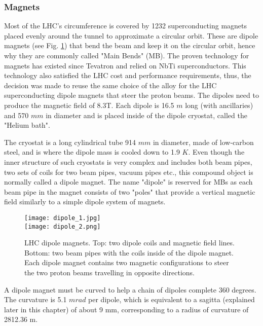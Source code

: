 \begin{normalsize}

\subsubsection{Magnets}\label{sec:magnets}

Most of the LHC's circumference is covered by 1232 superconducting magnets placed evenly around the tunnel to approximate a circular orbit. These are dipole magnets (see Fig. \ref{dipoles_coils}) that bend the beam and keep it on the circular orbit, hence why they are commonly called "Main Bends" (MB). The proven technology for magnets has existed since Tevatron and relied on NbTi superconductors. This technology also satisfied the LHC cost and performance requirements, thus, the decision was made to reuse the same choice of the alloy for the LHC superconducting dipole magnets that steer the proton beams. The dipoles need to produce the magnetic field of 8.3T. %
Each dipole is 16.5 $m$ long (with ancillaries) and 570 $mm$ in diameter and is placed inside of the dipole cryostat, called the "Helium bath". 

The cryostat is a long cylindrical tube 914 $mm$ in diameter, made of low-carbon steel, and is where the dipole mass is cooled down to 1.9 $K$. Even though the inner structure of such cryostats is very complex and includes both beam pipes, two sets of coils for two beam pipes, vacuum pipes etc., this compound object is normally called a dipole magnet. The name "dipole" is reserved for MBs as each beam pipe in the magnet consists of two "poles" that provide a vertical magnetic field similarly to a simple dipole system of magnets. 


\begin{figure}[H]
\centering
\texttt{[image: dipole\_1.jpg]}\\
\vspace{0.5cm}
\texttt{[image: dipole\_2.png]}
\caption[LHC dipoles]{LHC dipole magnets. Top: two dipole coils and magnetic field lines. Bottom: two beam pipes with the coils inside of the dipole magnet. Each dipole magnet contains two magnetic configurations to steer the two proton beams travelling in opposite directions. }
\label{dipoles_coils}
\end{figure}



A  dipole magnet  must  be  curved to help a chain of dipoles complete 360 degrees. The curvature is 5.1 $mrad$ per dipole, which is equivalent to a  sagitta (explained later in this chapter) of  about  9 mm, corresponding to a radius of curvature of 2812.36 m.



\end{normalsize}
